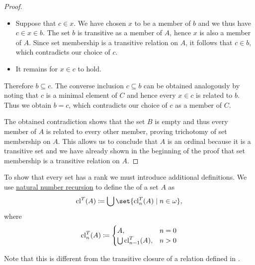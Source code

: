 \begin{proof}
\begin{itemize}
    \item Suppose that \( c \in x \). We have chosen \( x \) to be a member of \( b \) and we thus have \( c \in x \in b \). The set \( b \) is transitive as a member of \( A \), hence \( x \) is also a member of \( A \). Since set membership is a transitive relation on \( A \), it follows that \( c \in b \), which contradicts our choice of \( c \).

    \item It remains for \( x \in c \) to hold.
  \end{itemize}

  Therefore \( b \subseteq c \). The converse inclusion \( c \subseteq b \) can be obtained analogously by noting that \( c \) is a minimal element of \( C \) and hence every \( x \in c \) is related to \( b \). Thus we obtain \( b = c \), which contradicts our choice of \( c \) as a member of \( C \).

  The obtained contradiction shows that the set \( B \) is empty and thus every member of \( A \) is related to every other member, proving trichotomy of set membership on \( A \). This allows us to conclude that \( A \) is an ordinal because it is a transitive set and we have already shown in the beginning of the proof that set membership is a transitive relation on \( A \).
\end{proof}

\begin{definition}\label{def:transitive_closure_of_a_set}
  To show that every set has a rank we must introduce additional definitions. We use \hyperref[rem:natural_number_recursion]{natural number recursion} to define the  of a set \( A \) as
  \begin{equation*}
    \cl^T(A) \coloneqq \bigcup \set{ \cl_n^T(A) \given n \in \omega },
  \end{equation*}
  where
  \begin{equation*}
    \operatorname{cl}_n^T(A) \coloneqq \begin{cases}
      A,              &n = 0 \\
      \bigcup \operatorname{cl}_{n-1}^T(A), &n > 0
    \end{cases}
  \end{equation*}

  Note that this is different from the transitive closure of a relation defined in .
\end{definition}

